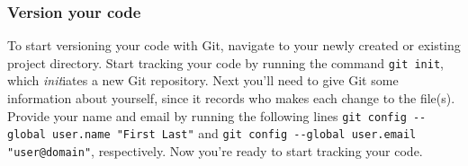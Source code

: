 \subsubsection{Version your code}

To start versioning your code with Git, navigate to your newly created or existing project directory. Start tracking your code by running the command \verb|git init|, which \textit{init}iates a new Git repository. Next you'll need to give Git some information about yourself, since it records who makes each change to the file(s). Provide your name and email by running the following lines \verb|git config --global user.name "First Last"| and \verb|git config --global user.email "user@domain"|, respectively. Now you're ready to start tracking your code.
